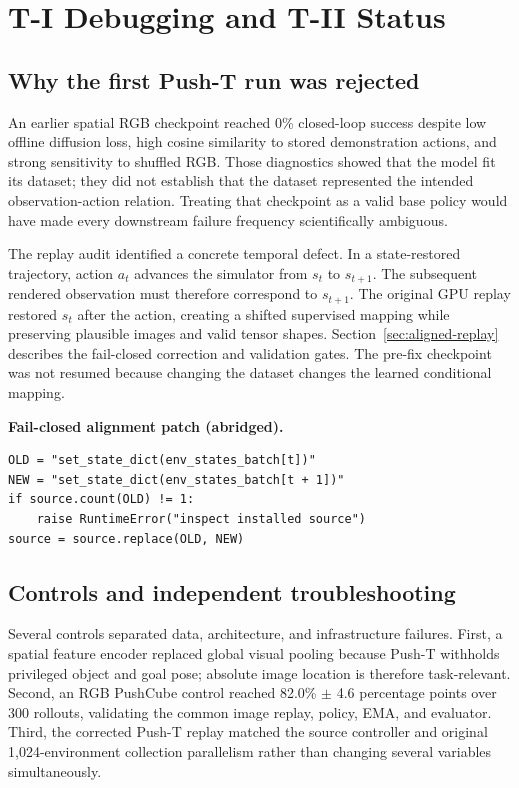 \section{T-I Debugging and T-II Status}
\label{sec:debugging}

\subsection{Why the first Push-T run was rejected}

An earlier spatial RGB checkpoint reached 0\% closed-loop success despite low offline diffusion
loss, high cosine similarity to stored demonstration actions, and strong sensitivity to shuffled
RGB. Those diagnostics showed that the model fit its dataset; they did not establish that the
dataset represented the intended observation-action relation. Treating that checkpoint as a valid
base policy would have made every downstream failure frequency scientifically ambiguous.

The replay audit identified a concrete temporal defect. In a state-restored trajectory, action
$a_t$ advances the simulator from $s_t$ to $s_{t+1}$. The subsequent rendered observation must
therefore correspond to $s_{t+1}$. The original GPU replay restored $s_t$ after the action,
creating a shifted supervised mapping while preserving plausible images and valid tensor shapes.
Section~\ref{sec:aligned-replay} describes the fail-closed correction and validation gates. The
pre-fix checkpoint was not resumed because changing the dataset changes the learned conditional
mapping.

\noindent\textbf{Fail-closed alignment patch (abridged).}
\begin{minipage}{\linewidth}
\scriptsize
\begin{verbatim}
OLD = "set_state_dict(env_states_batch[t])"
NEW = "set_state_dict(env_states_batch[t + 1])"
if source.count(OLD) != 1:
    raise RuntimeError("inspect installed source")
source = source.replace(OLD, NEW)
\end{verbatim}
\end{minipage}

\subsection{Controls and independent troubleshooting}

Several controls separated data, architecture, and infrastructure failures. First, a spatial
feature encoder replaced global visual pooling because Push-T withholds privileged object and goal
pose; absolute image location is therefore task-relevant. Second, an RGB PushCube control reached
82.0\% $\pm$ 4.6 percentage points over 300 rollouts, validating the common image replay, policy,
EMA, and evaluator. Third, the corrected Push-T replay matched the source controller and original
1,024-environment collection parallelism rather than changing several variables simultaneously.

